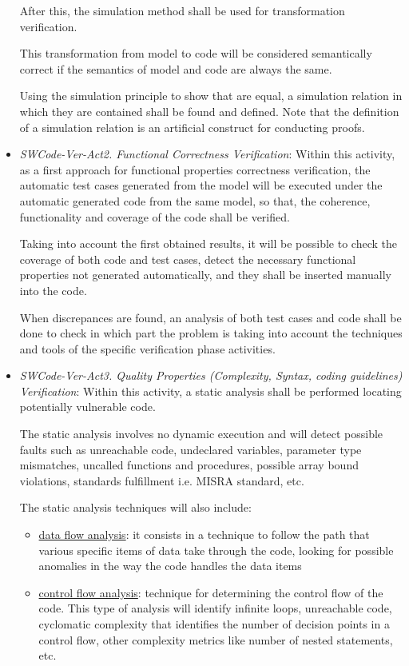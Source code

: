 \begin{itemize}
After this, the simulation method shall be used for transformation verification. 

This transformation from model to code will be considered semantically
correct if the semantics of model and code are always the same.

Using the simulation principle to show that are equal, a simulation
relation in which they are contained shall be found and defined. Note
that the definition of a simulation relation is an artificial
construct for conducting proofs.


\item {\it SWCode-Ver-Act2.  Functional Correctness Verification}:
  Within this activity, as a first approach for functional properties
  correctness verification, the automatic test cases generated from
  the model will be executed under the automatic generated code from
  the same model, so that, the coherence, functionality and coverage
  of the code shall be verified.

  Taking into account the first obtained results, it will be possible
  to check the coverage of both code and test cases, detect the
  necessary functional properties not generated automatically, and
  they shall be inserted manually into the code.

  When discrepances are found, an analysis of both test cases and code
  shall be done to check in which part the problem is taking into
  account the techniques and tools of the specific verification phase
  activities.


\item {\it SWCode-Ver-Act3. Quality Properties (Complexity, Syntax,
    coding guidelines) Verification}: Within this activity, a static
  analysis shall be performed locating potentially vulnerable code.

  The static analysis involves no dynamic execution and will detect
  possible faults such as unreachable code, undeclared variables,
  parameter type mismatches, uncalled functions and procedures,
  possible array bound violations, standards fulfillment i.e. MISRA
  standard, etc.

The static analysis techniques will also include:
\begin{itemize}
\item \underline{data flow analysis}: it consists in a technique to
  follow the path that various specific items of data take through the
  code, looking for possible anomalies in the way the code handles the
  data items
\item \underline{control flow analysis}: technique for determining the
  control flow of the code. This type of analysis will identify
  infinite loops, unreachable code, cyclomatic complexity that
  identifies the number of decision points in a control flow, other
  complexity metrics like number of nested statements, etc.
\end{itemize}


\end{itemize}
